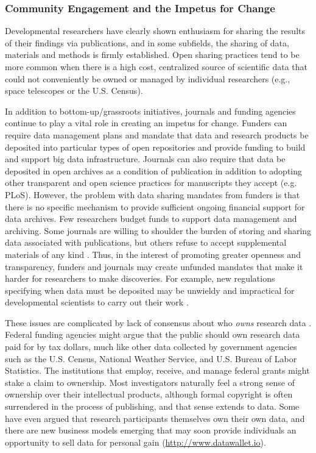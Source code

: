 \documentclass[letterpaper,man,apacite,natbib]{apa6}
\begin{document}
\subsubsection{Community Engagement and the Impetus for Change}

Developmental researchers have clearly shown enthusiasm for sharing the results of their findings via publications, and in some subfields, the sharing of data, materials and methods is firmly established.
Open sharing practices tend to be more common when there is a high cost, centralized source of scientific data that could not conveniently be owned or managed by individual researchers (e.g., space telescopes or the U.S. Census).

In addition to bottom-up/grassroots initiatives, journals and funding agencies continue to play a vital role in creating an impetus for change.
Funders can require data management plans and mandate that data and research products be deposited into particular types of open repositories and provide funding to build and support big data infrastructure.
Journals can also require that data be deposited in open archives as a condition of publication in addition to adopting other transparent and open science practices for manuscripts they accept (e.g. PLoS).
However, the problem with data sharing mandates from funders is that there is no specific mechanism to provide sufficient ongoing financial support for data archives.
Few researchers budget funds to support data management and archiving.
Some journals are willing to shoulder the burden of storing and sharing data associated with publications, but others refuse to accept supplemental materials of any kind \cite{maunsell_announcement_2010}.
Thus, in the interest of promoting greater openness and transparency, funders and journals may create unfunded mandates that make it harder for researchers to make discoveries.
For example, new regulations specifying when data must be deposited may be unwieldy and impractical for developmental scientists to carry out their work \cite{eisenberg_thoughts_2015, apa_data_sharing_work_group_data_2015}.

These issues are complicated by lack of consensus about who \emph{owns} research data \cite{who_owns_research_data}.
Federal funding agencies might argue that the public should own research data paid for by tax dollars, much like other data collected by government agencies such as the U.S. Census, National Weather Service, and U.S. Bureau of Labor Statistics.
The institutions that employ, receive, and manage federal grants might stake a claim to ownership.
Most investigators naturally feel a strong sense of ownership over their intellectual products, although formal copyright is often surrendered in the process of publishing, and that sense extends to data.
Some have even argued that research participants themselves own their own data, and there are new business models emerging that may soon provide individuals an opportunity to sell data for personal gain (\url{http://www.datawallet.io}).
\end{document}
